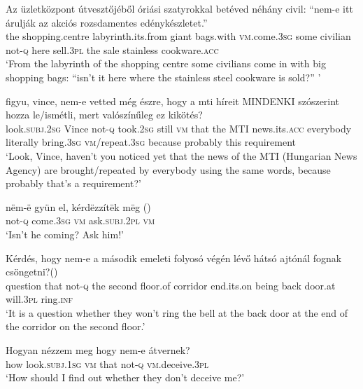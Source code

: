 \documentclass[output=paper,colorlinks,citecolor=brown]{langscibook}
\begin{document}
	\ea\label{ex:akcios}
	\gll Az üzletközpont útvesztőjéből óriási szatyrokkal betéved néhány civil: ``nem-e itt árulják az akciós rozsdamentes edénykészletet.''\\
	the shopping.centre labyrinth.its.from giant bags.with \textsc{vm}.come.\textsc{3sg} some civilian \hspace{0.17cm}not-\textsc{q} here sell.\textsc{3pl} the sale stainless cookware.\textsc{acc}\\ \jambox*{[HNC]}
	\glt `From the labyrinth of the shopping centre some civilians come in with big shopping bags: ``isn't it here where the stainless steel cookware is sold?'' '
	\z
	
	\ea\label{ex:figyu}
	\gll figyu, vince, nem-e vetted még észre, hogy a mti híreit MINDENKI szószerint hozza le/ismétli, mert valószínűleg ez kikötés? \\
	look.\textsc{subj.2sg} Vince not-\textsc{q} took.\textsc{2sg} still \textsc{vm} that the MTI news.its.\textsc{acc} everybody literally bring.\textsc{3sg} \textsc{vm}/repeat.\textsc{3sg} because probably this requirement\\ \jambox*{[HNC]}
	\glt `Look, Vince, haven't you noticed yet that the news of the MTI (Hungarian News Agency) are brought/repeated by everybody using the same words, because probably that's a requirement?'
	\z
	
	\ea\label{ex:gyun}
	\gll
	nëm-ë gyün el, kérdëzzítëk mëg \hspace{3.1cm}(\citealt{hegedus2001})\\
	not-\textsc{q} come.\textsc{3sg} \textsc{vm} ask.\textsc{subj.2pl} \textsc{vm}\\
	\glt `Isn't he coming? Ask him!'
	\z
	
	\ea\label{ex:masodik}
	\gll Kérdés, hogy nem-e a második emeleti folyosó végén lévő hátsó ajtónál fognak csöngetni?\hspace{4.8cm}(\citealt{nadasdy2004})\\
	question that not-\textsc{q} the second floor.of corridor end.its.on being back door.at will.\textsc{3pl} ring.\textsc{inf}\\
	\glt `It is a question whether they won't ring the bell at the back door at the end of the corridor on the second floor.'
	\z
	
	\ea\label{ex:atvernek}
	\gll Hogyan nézzem meg hogy nem-e átvernek?\\
	how look.\textsc{subj.1sg} \textsc{vm} that not-\textsc{q} \textsc{vm}.deceive.\textsc{3pl}\\
	\glt `How should I find out whether they don't deceive me?' 
	\z
	
\end{document}
